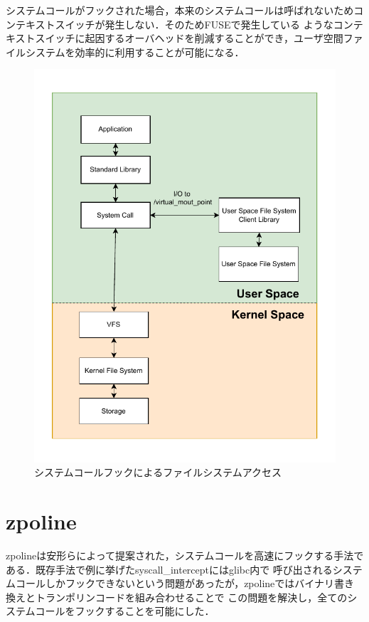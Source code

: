 \documentclass[a4paper，11pt]{jreport}
\begin{document}
システムコールがフックされた場合，本来のシステムコールは呼ばれないためコンテキストスイッチが発生しない．そのためFUSEで発生している
ようなコンテキストスイッチに起因するオーバヘッドを削減することができ，ユーザ空間ファイルシステムを効率的に利用することが可能になる．
\begin{figure}[h]
	\begin{minipage}[b]{1\columnwidth}
		\centering
		\includegraphics[width=0.9\linewidth]{./figure/syscall_hook_v2.pdf}
		\caption{システムコールフックによるファイルシステムアクセス}
		\label{fig:Syscall hook}
	\end{minipage}
\end{figure}

\section{zpoline}
zpolineは安形らによって提案された，システムコールを高速にフックする手法である．既存手法で例に挙げたsyscall\_interceptにはglibc内で
呼び出されるシステムコールしかフックできないという問題があったが，zpolineではバイナリ書き換えとトランポリンコードを組み合わせることで
この問題を解決し，全てのシステムコールをフックすることを可能にした．
\end{document}
